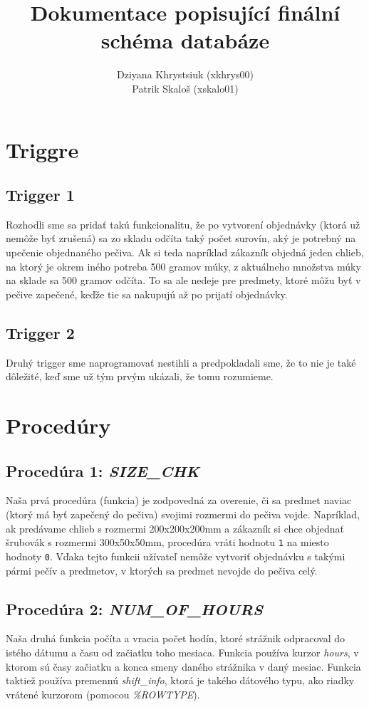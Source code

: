 \documentclass[a4paper]{article}
\title{Dokumentace popisující finální schéma databáze}
\author{Dziyana Khrystsiuk (xkhrys00) \\ Patrik Skaloš (xskalo01)}
\date{}
\begin{document}
  \maketitle


  \section{Triggre}

  \subsection{Trigger 1}
  Rozhodli sme sa pridať takú funkcionalitu, že po vytvorení objednávky (ktorá
  už nemôže byť zrušená) sa zo skladu odčíta taký počet surovín, aký je potrebný
  na upečenie objednaného pečiva. Ak si teda napríklad zákazník objedná jeden 
  chlieb, na ktorý je okrem iného potreba 500 gramov múky, z aktuálneho množstva
  múky na sklade sa 500 gramov odčíta. To sa ale nedeje pre predmety, ktoré môžu
  byť v pečive zapečené, keďže tie sa nakupujú až po prijatí objednávky.

  \subsection{Trigger 2}
  Druhý trigger sme naprogramovať nestihli a predpokladali sme, že to nie je
  také dôležité, keď sme už tým prvým ukázali, že tomu rozumieme.


  \section{Procedúry}

  \subsection{Procedúra 1: \textit{SIZE\_CHK}}
  Naša prvá procedúra (funkcia) je zodpovedná za overenie, či sa predmet naviac
  (ktorý má byť zapečený do pečiva) svojimi rozmermi do pečiva vojde. Napríklad,
  ak predávame chlieb s rozmermi 200x200x200mm a zákazník si chce objednať 
  šrubovák s rozmermi 300x50x50mm, procedúra vráti hodnotu \verb|1| na miesto
  hodnoty \verb|0|. Vďaka tejto funkcii užívateľ nemôže vytvoriť objednávku s
  takými pármi pečív a predmetov, v ktorých sa predmet nevojde do pečiva celý.

  \subsection{Procedúra 2: \textit{NUM\_OF\_HOURS}}
  Naša druhá funkcia počíta a vracia počet hodín, ktoré strážnik odpracoval
  do istého dátumu a času od začiatku toho mesiaca. Funkcia používa kurzor 
  \textit{hours}, v ktorom sú časy začiatku a konca smeny daného strážnika v 
  daný mesiac. Funkcia taktiež používa premennú \textit{shift\_info}, ktorá je
  takého dátového typu, ako riadky vrátené kurzorom (pomocou \textit{\%ROWTYPE}).
\end{document}
